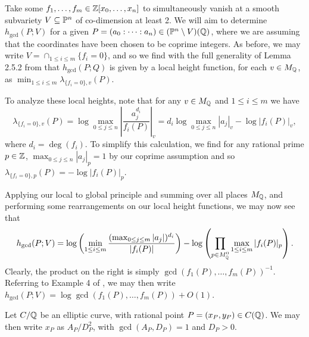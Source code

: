 \begin{example}
    Take some $f_1, \ldots, f_m \in \mathbb{Z}[x_0, \ldots, x_n]$ to simultaneously vanish at a smooth subvariety $V \subseteq \mathbb{P}^n$ of co-dimension at least 2.
    We will aim to determine $h_{\gcd}(P; V)$ for a given $P = (a_0 : \cdots : a_n) \in (\mathbb{P}^n \setminus V)(\mathbb{Q})$,
    where we are assuming that the coordinates have been chosen to be coprime integers.
    As before, we may write $V = \cap_{1 \leq i \leq m} \{ f_i = 0 \}$,
    and so we find with the full generality of Lemma 2.5.2 from \cite{Vojta_2006} that $h_{\gcd}(P; Q)$ is given by a local height function, 
    for each $v \in M_{\mathbb{Q}}$, as $\min_{1 \leq i \leq m}\lambda_{\{f_ i = 0\}, v}(P)$.
    
    To analyze these local heights,
    note that for any $v \in M_{\mathbb{Q}}$ and $1 \leq i \leq m$ we have
    \[
        \lambda_{\{f_i = 0\}, v}(P) 
            = \log \max_{0 \leq j \leq n} \left| \frac{a_j^{d_i}}{f_i(P)} \right|_v
            = d_i \log \max_{0 \leq j \leq n} |a_j|_v - \log |f_i(P)|_v,
    \]
    where $d_i = \deg(f_i)$.
    To simplify this calculation, we find for any rational prime $p \in \mathbb{Z}$,
    $\max_{0 \leq j \leq n} |a_j|_p = 1$ by our coprime assumption and so $\lambda_{\{f_i = 0\}, p}(P) = -\log |f_i(P)|_p$.

    Applying our local to global principle and summing over all places $M_{\mathbb{Q}}$,
    and performing some rearrangements on our local height functions,
    we may now see that
    \[
        h_{\gcd}(P; V) = \log \left(\min_{1 \leq i \leq m} \frac{(\max_{0 \leq j \leq m} |a_j|)^{d_i}}{|f_i(P)|}\right)
        - \log \left(
            \prod_{p \in M_{\mathbb{Q}}^0}  \max_{1 \leq i \leq m} |f_i(P)|_p
        \right).
    \]
    Clearly, the product on the right is simply $\gcd(f_1(P), \ldots, f_m(P))^{-1}$.
    Referring to Example 4 of \cite{Silverman_2004},
    we may then write $h_{\gcd}(P; V) = \log \gcd(f_1(P), \ldots, f_m(P)) + O(1)$.
\end{example}

\begin{notation}
    Let $C / \mathbb{Q}$ be an elliptic curve, with rational point $P = (x_P, y_P) \in C(\mathbb{Q})$.
    We may then write $x_P$ as $A_P / D_P^2$, with $\gcd(A_P, D_P) = 1$ and $D_P > 0$.
\end{notation}

